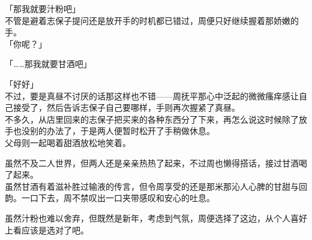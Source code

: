 「那我就要汁粉吧」\\

不管是避着志保子提问还是放开手的时机都已错过，周便只好继续握着那娇嫩的手。\\

「你呢？」

「……那我就要甘酒吧」

「好好」\\

不过，要是真昼不讨厌的话那这样也不错——周抚平那心中泛起的微微瘙痒感让自己接受了，然后告诉志保子自己要哪样，手则再次握紧了真昼。\\



不多久，从店里回来的志保子把买来的各种东西分了下来，再怎么说这时候除了放手也没别的办法了，于是两人便暂时松开了手稍做休息。\\

父母则一起喝着甜酒放松地笑着。

虽然不及二人世界，但两人还是亲亲热热了起来，不过周也懒得搭话，接过甘酒喝了起来。\\

虽然甘酒有着滋补胜过输液的传言，但令周享受的还是那米那沁人心脾的甘甜与回韵。一口下去，周不禁叹出一口夹带感叹和安心的吐息。

虽然汁粉也难以舍弃，但既然是新年，考虑到气氛，周便选择了这边，从个人喜好上看应该是选对了吧。\\

